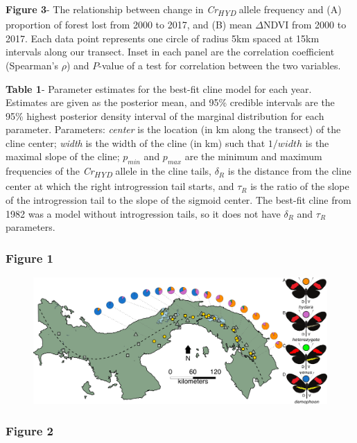 \documentclass[]{article}
\begin{document}
\textbf{Figure 3}- The relationship between change in
\textit{Cr\textsubscript{HYD}} allele frequency and (A) proportion of
forest lost from 2000 to 2017, and (B) mean \(\Delta\)NDVI from 2000 to
2017. Each data point represents one circle of radius 5km spaced at 15km
intervals along our transect. Inset in each panel are the correlation
coefficient (Spearman's \(\rho\)) and \(P\)-value of a test for
correlation between the two variables.

\textbf{Table 1}- Parameter estimates for the best-fit cline model for
each year. Estimates are given as the posterior mean, and 95\% credible
intervals are the 95\% highest posterior density interval of the
marginal distribution for each parameter. Parameters: \textit{center} is
the location (in km along the transect) of the cline center;
\textit{width} is the width of the cline (in km) such that \(1/width\)
is the maximal slope of the cline; \(p_{min}\) and \(p_{max}\) are the
minimum and maximum frequencies of the \textit{Cr\textsubscript{HYD}}
allele in the cline tails, \(\delta_{R}\) is the distance from the cline
center at which the right introgression tail starts, and \(\tau_{R}\) is
the ratio of the slope of the introgression tail to the slope of the
sigmoid center. The best-fit cline from 1982 was a model without
introgression tails, so it does not have \(\delta_{R}\) and \(\tau_{R}\)
parameters.

\pagebreak

\subsubsection{Figure 1}\label{figure-1}

\begin{figure}[h]
\includegraphics{figure_1_final}
\end{figure}

\pagebreak

\subsubsection{Figure 2}\label{figure-2}
\end{document}
